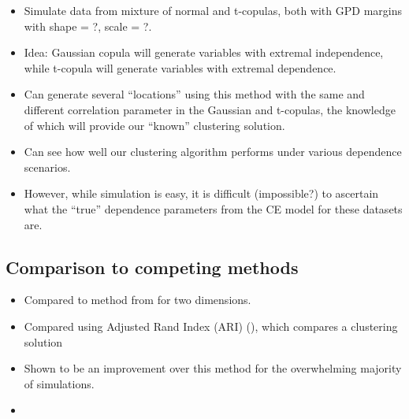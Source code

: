 \documentclass{article}
\numberwithin{equation}{section}
\begin{document}
\begin{itemize}
\begin{itemize}
    \item Simulate data from mixture of normal and t-copulas, both with GPD margins with shape = ?, scale = ?.
    \item Idea: Gaussian copula will generate variables with extremal independence, while t-copula will generate variables with extremal dependence. 
    \item Can generate several ``locations'' using this method with the same and different correlation parameter in the Gaussian and t-copulas, the knowledge of which will provide our ``known'' clustering solution. 
    \item Can see how well our clustering algorithm performs under various dependence scenarios.
    \item However, while simulation is easy, it is difficult (impossible?) to ascertain what the ``true'' dependence parameters from the CE model for these datasets are. 
\end{itemize}

\subsection{Comparison to competing methods} \label{subsec:sim_competing_methods}


\begin{itemize}
    \item Compared to method from \cite{Vignotto2021} for two dimensions. 
    \item Compared using Adjusted Rand Index (ARI) (), which compares a clustering solution
    \item Shown to be an improvement over this method for the overwhelming majority of simulations. 
    \item {}
\end{itemize}


\end{itemize}
\end{document}
